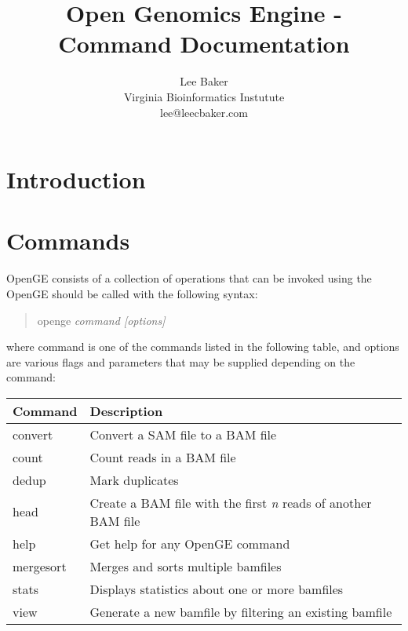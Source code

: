 \documentclass[11pt]{article}
\newcommand {\cmd}[1] {\begin{quote}#1\end{quote}}
\begin{document}
\title{Open Genomics Engine - Command Documentation}
\author{Lee Baker\\
Virginia Bioinformatics Instutute\\
lee@leecbaker.com}
\maketitle

\section {Introduction}
\section {Commands}
OpenGE consists of a collection of operations that can be invoked using the 
OpenGE should be called with the following syntax:

\cmd{openge \textit{command [options]}}

where command is one of the commands listed in the following table, and options are various flags and parameters that may be supplied depending on the command:

\begin{center}
\begin{tabular}{lp{3.5in}}
\hline
Command&Description\\ \hline
convert&Convert a SAM file to a BAM file\\
count&Count reads in a BAM file\\
dedup&Mark duplicates\\
head&Create a BAM file with the first \textit{n} reads of another BAM file\\
help&Get help for any OpenGE command\\
mergesort&Merges and sorts multiple bamfiles\\
stats&Displays statistics about one or more bamfiles\\
view&Generate a new bamfile by filtering an existing bamfile\\
\end{tabular}
\end{center}
\end{document}

